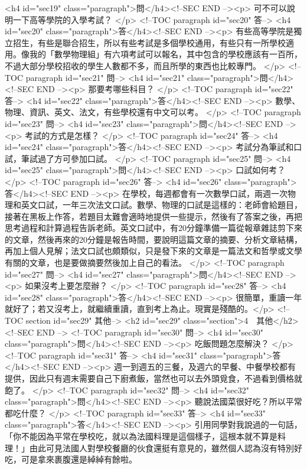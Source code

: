 {{{{<h4 id="sec19" class="paragraph">問</h4><!--SEC END --><p>
可不可以說明一下高等學院的入學考試？
</p>
<!--TOC paragraph id="sec20" 答-->
<h4 id="sec20" class="paragraph">答</h4><!--SEC END --><p>
有些高等學院是獨立招生，有些是聯合招生，所以有些考試是多個學校通用，有些只有一所學校適用。像我的「數學物理組」有六項考試可以報名，其中包含的學校應該有一百所，不過大部分學校招收的學生人數都不多，而且所學的東西也比較專門。
</p>
<!--TOC paragraph id="sec21" 問-->
<h4 id="sec21" class="paragraph">問</h4><!--SEC END --><p>
那要考哪些科目？
</p>
<!--TOC paragraph id="sec22" 答-->
<h4 id="sec22" class="paragraph">答</h4><!--SEC END --><p>
數學、物理、資訊、英文、法文，有些學校還有中文可以考。
</p>
<!--TOC paragraph id="sec23" 問-->
<h4 id="sec23" class="paragraph">問</h4><!--SEC END --><p>
考試的方式是怎樣？
</p>
<!--TOC paragraph id="sec24" 答-->
<h4 id="sec24" class="paragraph">答</h4><!--SEC END --><p>
考試分為筆試和口試，筆試過了方可參加口試。
</p>
<!--TOC paragraph id="sec25" 問-->
<h4 id="sec25" class="paragraph">問</h4><!--SEC END --><p>
口試如何考？
</p>
<!--TOC paragraph id="sec26" 答-->
<h4 id="sec26" class="paragraph">答</h4><!--SEC END --><p>
在學校，每週都會有一次數學口試，兩週一次物理和英文口試，一年三次法文口試。數學、物理的口試是這樣的：老師會給題目，接著在黑板上作答，若題目太難會適時地提供一些提示，然後有了答案之後，再把思考過程和計算過程告訴老師。英文口試中，有20分鐘準備一篇從報章雜誌剪下來的文章，然後再來的20分鐘是報告時間，要說明這篇文章的摘要、分析文章結構，再加上個人見解；法文口試也頗類似，只是發下來的文章是一篇法文和哲學或文學有關的文章，也是要做摘要然後加上自己的看法。
</p>
<!--TOC paragraph id="sec27" 問-->
<h4 id="sec27" class="paragraph">問</h4><!--SEC END --><p>
如果沒考上要怎麼辦？
</p>
<!--TOC paragraph id="sec28" 答-->
<h4 id="sec28" class="paragraph">答</h4><!--SEC END --><p>
很簡單，重讀一年就好了；若又沒考上，就繼續重讀，直到考上為止。現實是殘酷的。</p>
<!--TOC section id="sec29" 其他-->
<h2 id="sec29" class="section">4  其他</h2><!--SEC END -->
<!--TOC paragraph id="sec30" 問-->
<h4 id="sec30" class="paragraph">問</h4><!--SEC END --><p>
吃飯問題怎麼解決？
</p>
<!--TOC paragraph id="sec31" 答-->
<h4 id="sec31" class="paragraph">答</h4><!--SEC END --><p>
週一到週五的三餐，及週六的早餐、中餐學校都有提供，因此只有週末需要自己下廚煮飯，當然也可以去外頭覓食，不過看到價格就飽了。
</p>
<!--TOC paragraph id="sec32" 問-->
<h4 id="sec32" class="paragraph">問</h4><!--SEC END --><p>
聽說法國菜很好吃？所以平常都吃什麼？
</p>
<!--TOC paragraph id="sec33" 答-->
<h4 id="sec33" class="paragraph">答</h4><!--SEC END --><p>
引用同學對我說過的一句話，「你不能因為平常在學校吃，就以為法國料理是這個樣子，這根本就不算是料理！」由此可見法國人對學校餐廳的伙食還挺有意見的，雖然個人認為沒有特別好吃，可是拿來裹腹還是綽綽有餘啦。
}}}}
